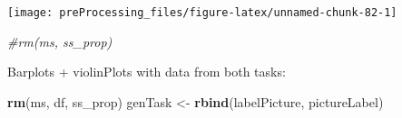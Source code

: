 \documentclass[
]{article}
\newenvironment{Shaded}{\begin{snugshade}}{\end{snugshade}}
\newcommand{\CommentTok}[1]{\textcolor[rgb]{0.56,0.35,0.01}{\textit{#1}}}
\newcommand{\KeywordTok}[1]{\textcolor[rgb]{0.13,0.29,0.53}{\textbf{#1}}}
\newcommand{\NormalTok}[1]{#1}
\newcommand{\StringTok}[1]{\textcolor[rgb]{0.31,0.60,0.02}{#1}}
\begin{document}
\begin{center}\texttt{[image: preProcessing\_files/figure-latex/unnamed-chunk-82-1]} \end{center}

\begin{Shaded}
\begin{Highlighting}[]
\CommentTok{#rm(ms, ss_prop)}
\end{Highlighting}
\end{Shaded}

Barplots + violinPlots with data from both tasks:

\begin{Shaded}
\begin{Highlighting}[]
\KeywordTok{rm}\NormalTok{(ms, df, ss_prop)}
\NormalTok{genTask <-}\StringTok{ }\KeywordTok{rbind}\NormalTok{(labelPicture, pictureLabel)}
\end{Highlighting}
\end{Shaded}
\end{document}

